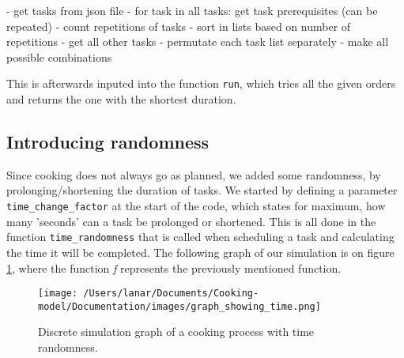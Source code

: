 \begin{verbnobox}
- get tasks from json file
- for task in all tasks:
    get task prerequisites (can be repeated)
- count repetitions of tasks
- sort in lists based on number of repetitions
- get all other tasks
- permutate each task list separately
- make all possible combinations 
\end{verbnobox}

This is afterwards inputed into the function \texttt{run}, which tries all the given orders and returns the one with the shortest duration. 


\subsection{Introducing randomness}
Since cooking does not always go as planned, we added some randomness, by prolonging/shortening the duration of tasks. 
We started by defining a parameter \texttt{time\_change\_factor} at the start of the code, which states for maximum, how many 'seconds' can a task be prolonged or shortened. 
This is all done in the function \texttt{time\_randomness} that is called when scheduling a task and calculating the time it will be completed. 
The following graph of our simulation is on figure \ref{fig2}, where the function \textit{f} represents the previously mentioned function. 

\begin{figure}[H]
    \centerline{\texttt{[image: /Users/lanar/Documents/Cooking-model/Documentation/images/graph\_showing\_time.png]}}
    \caption{Discrete simulation graph of a cooking process with time randomness.}
    \label{fig2}
\end{figure}


